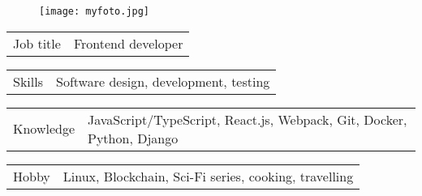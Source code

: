 \documentclass[10pt,A4]{article}
\newcommand{\tzlarrow}{(0,0) -- (0.2,0) -- (0.3,0.2) -- (0.2,0.4) -- (0,0.4) -- (0.1,0.2) -- cycle;}
\newcommand{\larrow}[1]
{\begin{tikzpicture}[scale=0.58]
	 \filldraw[fill=#1!100,draw=#1!100!black]  \tzlarrow
 \end{tikzpicture}
}
\newcommand{\metasection}[2]
{
\begin{tabular*}{1\textwidth}{p{2.4cm} p{11cm}}
\larrow{bgcol}	\normalsize{\textcolor{sectcol}{#1}}&#2\\[12pt]
\end{tabular*}
}
\begin{document}
\pagestyle{fancy}


\vspace{-20.55pt}


\hspace{-0.25\linewidth}\colorbox{bgcol}{}



\begin{figure}[H]
	\begin{flushright}
		\texttt{[image: myfoto.jpg]}	%
	\end{flushright}
\end{figure}



\vspace{-120pt}

\metasection{Job title}{Frontend developer}
\metasection{Skills}{Software design, development, testing}
\metasection{Knowledge}{JavaScript/TypeScript, React.js, Webpack, Git, Docker, Python, Django}
\metasection{Hobby}{Linux, Blockchain, Sci-Fi series, cooking, travelling}
\end{document}
